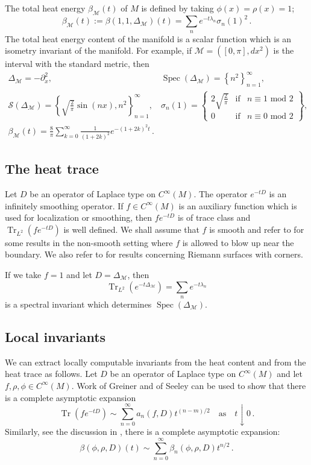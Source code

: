 \documentclass{amsart}
\begin{document}
The total heat energy $\beta_{\mathcal{M}}(t)$ of $M$ is defined by taking $\phi(x)=\rho(x)=1$;
\begin{equation}\label{eqn-1.d}
\beta_{\mathcal{M}}(t):=\beta(1,1,\Delta_{\mathcal{M}})(t)=\sum_ne^{-t\lambda_n}\sigma_n(1)^2\,.
\end{equation}
The total heat energy content of the manifold is a scalar function which is an isometry invariant of the
manifold.
For example, if $\mathcal{M}=([0,\pi],dx^2)$ is the interval with the standard metric, then 
$$\begin{array}{ll}
\Delta_{\mathcal{M}}=-\partial_x^2,&\displaystyle
\operatorname{Spec}(\Delta_{\mathcal{M}})=\left\{n^2\right\}_{n=1}^\infty,\\
\mathcal{S}(\Delta_{\mathcal{M}})=\left\{\sqrt{\frac2\pi}\sin(nx),n^2\right\}_{n=1}^\infty,&
\sigma_n(1)=\left\{\begin{array}{lll}
2\sqrt{\frac2\pi}&\text{if}&n\equiv1\text{ mod }2\\
0&\text{if}&n\equiv0\text{ mod }2\end{array}\right\},\\
\beta_{\mathcal{M}}(t)=\displaystyle{\textstyle\frac8\pi}\sum_{k=0}^\infty
{\frac{1}{(1+2k)^2}}e^{-(1+2k)^2t}\,.
\end{array}$$

\subsection{The heat trace} Let $D$ be an operator of Laplace type on $C^\infty(M)$. The operator
$e^{-tD}$ is an infinitely smoothing operator. If $f\in C^\infty(M)$ is an auxiliary function which
is used for localization or smoothing, then $fe^{-tD}$ is of trace class and
$\operatorname{Tr}_{L^2}(fe^{-tD})$
is well defined. We shall assume that $f$ is smooth and refer to \cite{BeGiKiSe08} for some results in the
non-smooth setting where
$f$ is allowed to blow up near the boundary. We also refer to \cite{McSi67} for results concerning Riemann
surfaces with corners.

If we take $f=1$ and let $D=\Delta_{\mathcal{M}}$, then
$$\operatorname{Tr}_{L^2}(e^{-t\Delta_{\mathcal{M}}})=\sum_ne^{-t\lambda_n}$$
is a spectral invariant which determines 
$\operatorname{Spec}(\Delta_{\mathcal{M}})$.

\subsection{Local invariants} We can extract locally computable invariants from the heat content and from the
heat trace as follows. Let $D$ be an operator of Laplace type on $C^\infty(M)$ and let $f,\rho,\phi\in
C^\infty(M)$. Work of Greiner
\cite{Gr68} and of Seeley
\cite{Se69, Se69a} can be used to show that there is a complete asymptotic expansion
\begin{equation}\label{eqn-1.e}
\operatorname{Tr}(fe^{-tD})\sim\sum_{n=0}^\infty a_n(f,D)t^{(n-m)/2}
\quad\text{as}\quad t\downarrow0\,.
\end{equation}
Similarly, see the discussion in
\cite{BeGiSe08, BeGeKiKo07}, there is a complete asymptotic expansion:
$$
\beta(\phi,\rho,D)(t)\sim\sum_{n=0}^\infty\beta_n(\phi,\rho,D)t^{n/2}\,.
$$
\end{document}
